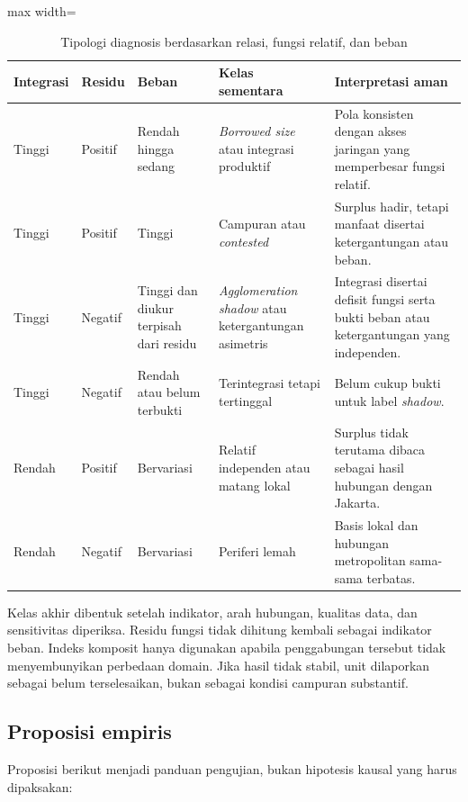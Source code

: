 \documentclass[11pt,a4paper,oneside,openany,indonesian]{report}
\begin{document}
\begin{table}[H]
\centering
\caption{Tipologi diagnosis berdasarkan relasi, fungsi relatif, dan beban}
\label{tab:tipologi}
\begin{adjustbox}{max width=\textwidth}
\begin{tabular}{p{}p{}p{}p{}p{}}
\toprule
\textbf{Integrasi} & \textbf{Residu} & \textbf{Beban} & \textbf{Kelas sementara} & \textbf{Interpretasi aman}\\
\midrule
Tinggi & Positif & Rendah hingga sedang & \textit{Borrowed size} atau integrasi produktif & Pola konsisten dengan akses jaringan yang memperbesar fungsi relatif.\\
Tinggi & Positif & Tinggi & Campuran atau \textit{contested} & Surplus hadir, tetapi manfaat disertai ketergantungan atau beban.\\
Tinggi & Negatif & Tinggi dan diukur terpisah dari residu & \textit{Agglomeration shadow} atau ketergantungan asimetris & Integrasi disertai defisit fungsi serta bukti beban atau ketergantungan yang independen.\\
Tinggi & Negatif & Rendah atau belum terbukti & Terintegrasi tetapi tertinggal & Belum cukup bukti untuk label \textit{shadow}.\\
Rendah & Positif & Bervariasi & Relatif independen atau matang lokal & Surplus tidak terutama dibaca sebagai hasil hubungan dengan Jakarta.\\
Rendah & Negatif & Bervariasi & Periferi lemah & Basis lokal dan hubungan metropolitan sama-sama terbatas.\\
\bottomrule
\end{tabular}
\end{adjustbox}
\end{table}

Kelas akhir dibentuk setelah indikator, arah hubungan, kualitas data, dan sensitivitas diperiksa. Residu fungsi tidak dihitung kembali sebagai indikator beban. Indeks komposit hanya digunakan apabila penggabungan tersebut tidak menyembunyikan perbedaan domain. Jika hasil tidak stabil, unit dilaporkan sebagai belum terselesaikan, bukan sebagai kondisi campuran substantif.

\subsection{Proposisi empiris}

Proposisi berikut menjadi panduan pengujian, bukan hipotesis kausal yang harus dipaksakan:
\end{document}
